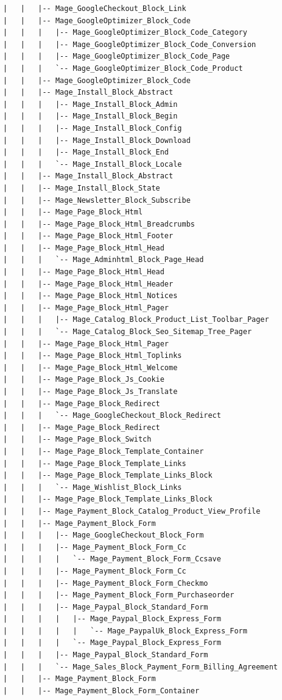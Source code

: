 \documentclass[oneside]{book}
\begin{document}
\begin{lstlisting}
|   |   |-- Mage_GoogleCheckout_Block_Link
|   |   |-- Mage_GoogleOptimizer_Block_Code
|   |   |   |-- Mage_GoogleOptimizer_Block_Code_Category
|   |   |   |-- Mage_GoogleOptimizer_Block_Code_Conversion
|   |   |   |-- Mage_GoogleOptimizer_Block_Code_Page
|   |   |   `-- Mage_GoogleOptimizer_Block_Code_Product
|   |   |-- Mage_GoogleOptimizer_Block_Code
|   |   |-- Mage_Install_Block_Abstract
|   |   |   |-- Mage_Install_Block_Admin
|   |   |   |-- Mage_Install_Block_Begin
|   |   |   |-- Mage_Install_Block_Config
|   |   |   |-- Mage_Install_Block_Download
|   |   |   |-- Mage_Install_Block_End
|   |   |   `-- Mage_Install_Block_Locale
|   |   |-- Mage_Install_Block_Abstract
|   |   |-- Mage_Install_Block_State
|   |   |-- Mage_Newsletter_Block_Subscribe
|   |   |-- Mage_Page_Block_Html
|   |   |-- Mage_Page_Block_Html_Breadcrumbs
|   |   |-- Mage_Page_Block_Html_Footer
|   |   |-- Mage_Page_Block_Html_Head
|   |   |   `-- Mage_Adminhtml_Block_Page_Head
|   |   |-- Mage_Page_Block_Html_Head
|   |   |-- Mage_Page_Block_Html_Header
|   |   |-- Mage_Page_Block_Html_Notices
|   |   |-- Mage_Page_Block_Html_Pager
|   |   |   |-- Mage_Catalog_Block_Product_List_Toolbar_Pager
|   |   |   `-- Mage_Catalog_Block_Seo_Sitemap_Tree_Pager
|   |   |-- Mage_Page_Block_Html_Pager
|   |   |-- Mage_Page_Block_Html_Toplinks
|   |   |-- Mage_Page_Block_Html_Welcome
|   |   |-- Mage_Page_Block_Js_Cookie
|   |   |-- Mage_Page_Block_Js_Translate
|   |   |-- Mage_Page_Block_Redirect
|   |   |   `-- Mage_GoogleCheckout_Block_Redirect
|   |   |-- Mage_Page_Block_Redirect
|   |   |-- Mage_Page_Block_Switch
|   |   |-- Mage_Page_Block_Template_Container
|   |   |-- Mage_Page_Block_Template_Links
|   |   |-- Mage_Page_Block_Template_Links_Block
|   |   |   `-- Mage_Wishlist_Block_Links
|   |   |-- Mage_Page_Block_Template_Links_Block
|   |   |-- Mage_Payment_Block_Catalog_Product_View_Profile
|   |   |-- Mage_Payment_Block_Form
|   |   |   |-- Mage_GoogleCheckout_Block_Form
|   |   |   |-- Mage_Payment_Block_Form_Cc
|   |   |   |   `-- Mage_Payment_Block_Form_Ccsave
|   |   |   |-- Mage_Payment_Block_Form_Cc
|   |   |   |-- Mage_Payment_Block_Form_Checkmo
|   |   |   |-- Mage_Payment_Block_Form_Purchaseorder
|   |   |   |-- Mage_Paypal_Block_Standard_Form
|   |   |   |   |-- Mage_Paypal_Block_Express_Form
|   |   |   |   |   `-- Mage_PaypalUk_Block_Express_Form
|   |   |   |   `-- Mage_Paypal_Block_Express_Form
|   |   |   |-- Mage_Paypal_Block_Standard_Form
|   |   |   `-- Mage_Sales_Block_Payment_Form_Billing_Agreement
|   |   |-- Mage_Payment_Block_Form
|   |   |-- Mage_Payment_Block_Form_Container

\end{lstlisting}
\end{document}
